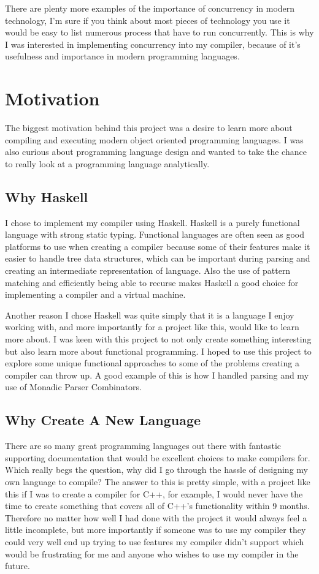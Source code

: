 There are plenty more examples of the importance of concurrency in modern technology, I'm sure if you think about most pieces of technology you use it would be easy to list numerous process that have to run concurrently. This is why I was interested in implementing concurrency into my compiler, because of it's usefulness and importance in modern programming languages.   

\section{Motivation}

The biggest motivation behind this project was a desire to learn more about compiling and executing modern object oriented programming languages. I was also curious about programming language design and wanted to take the chance to really look at a programming language analytically.

\subsection{Why Haskell}

I chose to implement my compiler using Haskell. Haskell is a purely functional language with strong static typing. Functional languages are often seen as good platforms to use when creating a compiler because some of their features make it easier to handle tree data structures, which can be important during parsing and creating an intermediate representation of language. Also the use of pattern matching and efficiently being able to recurse makes Haskell a good choice for implementing a compiler and a virtual machine.

Another reason I chose Haskell was quite simply that it is a language I enjoy working with, and more importantly for a project like this, would like to learn more about. I was keen with this project to not only create something interesting but also learn more about functional programming. I hoped to use this project to explore some  unique functional approaches to some of the problems creating a compiler can throw up. A good example of this is how I handled parsing and my use of Monadic Parser Combinators.

\subsection{Why Create A New Language}

There are so many great programming languages out there with fantastic supporting documentation that would be excellent choices to make compilers for. Which really begs the question, why did I go through the hassle of designing my own language to compile? The answer to this is pretty simple, with a project like this if I was to create a compiler for C++, for example, I would never have the time to create something that covers all of C++'s functionality within 9 months. Therefore no matter how well I had done with the project it would always feel a little incomplete, but more importantly if someone was to use my compiler they could very well end up trying to use features my compiler didn't support which would be frustrating for me and anyone who wishes to use my compiler in the future.

